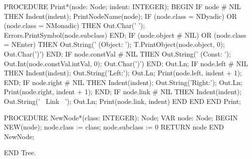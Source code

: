\documentclass[utf8]{lgu}
\begin{document}
\begin{modula2long}
PROCEDURE Print*(node: Node; indent: INTEGER);
BEGIN
  IF node # NIL THEN
    Indent(indent); PrintNodeName(node);
    IF (node.class = NDyadic) OR (node.class = NMonadic) THEN
      Out.Char(' ');
      Errors.PrintSymbol(node.subclass)
    END;
    IF (node.object # NIL) OR (node.class = NEnter) THEN
      Out.String(' (Object: ');
      T.PrintObject(node.object, 0);
      Out.Char(')')
    END;
    IF node.constVal # NIL THEN
      Out.String(' (Const: ');
      Out.Int(node.constVal.intVal, 0);
      Out.Char(')')
    END;
    Out.Ln;
    IF node.left # NIL THEN
      Indent(indent); Out.String('Left:'); Out.Ln;
      Print(node.left, indent + 1);
    END;
    IF node.right # NIL THEN
      Indent(indent); Out.String('Right:'); Out.Ln;
      Print(node.right, indent + 1);
    END;
    IF node.link # NIL THEN
      Indent(indent); Out.String('~ Link ~'); Out.Ln;
      Print(node.link, indent)
    END
  END
END Print;

PROCEDURE NewNode*(class: INTEGER): Node;
VAR node: Node;
BEGIN
  NEW(node);
  node.class := class;
  node.subclass := 0
RETURN node END NewNode;

END Tree.
\end{modula2long}
\end{document}
